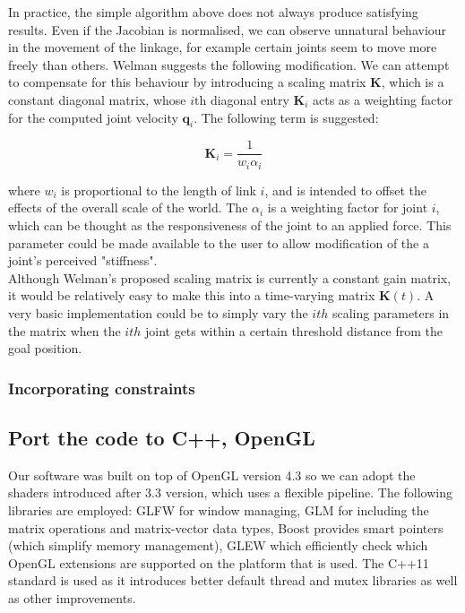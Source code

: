\documentclass[paper=a4, fontsize=11pt]{scrartcl} %
\numberwithin{equation}{section} %
\numberwithin{figure}{section} %
\numberwithin{table}{section} %
\newcommand{\vect}[1]{\mathbf{#1}}
\begin{document}
In practice, the simple algorithm above does not always produce satisfying results. Even if the Jacobian is normalised, we can observe unnatural behaviour in the movement of the linkage, for example certain joints seem to move more freely than others. Welman suggests the following modification. We can attempt to compensate for this behaviour by introducing a scaling matrix $\vect{K}$, which is a constant diagonal matrix, whose $i \text{th}$ diagonal entry $\vect{K}_i$ acts as a weighting factor for the computed joint velocity $\vect{q}_i$. The following term is suggested:

\begin{equation}
\vect{K}_i = \frac{1}{w_i \alpha_i}
\end{equation}

where $w_i$ is proportional to the length of link $i$, and is intended to offset the effects of the overall scale of the world. The $\alpha_i$ is a weighting factor for joint $i$, which can be thought as the responsiveness of the joint to an applied force. This parameter could be made available to the user to allow modification of the a joint's perceived "stiffness". \\

Although Welman's proposed scaling matrix is currently a constant gain matrix, it would be relatively easy to make this into a time-varying matrix $\vect{K}(t)$. A very basic implementation could be to simply vary the $ith$ scaling parameters in the matrix when the $ith$ joint gets within a certain threshold distance from the goal position.

\subsubsection{Incorporating constraints}



\subsection{ Port the code to C++, OpenGL}
Our software was built on top of OpenGL version 4.3 so we can adopt the shaders introduced after 3.3 version, which uses a flexible pipeline. The following libraries are employed: GLFW for window managing, GLM  for including the matrix operations and matrix-vector data types, Boost provides smart pointers (which simplify memory management), GLEW which efficiently check which OpenGL extensions are supported on the platform that is used. The C++11 standard is used as it introduces better default thread and mutex libraries as well as other improvements. \\
\end{document}

